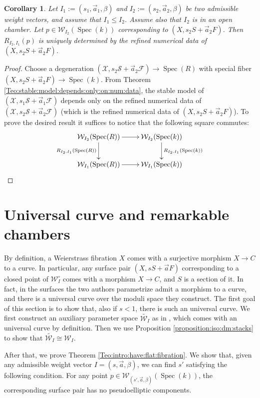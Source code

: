 \documentclass[11pt]{amsart}
\newcommand{\cF}{\mathcal{F}}
\newcommand{\cE}{\mathcal{W}}
\newcommand{\cX}{\mathcal{X}}
\newcommand{\cS}{\mathcal{S}}
\newcommand{\spec}{\operatorname{Spec}}
\newtheorem{Cor}[theorem]{Corollary}
\theoremstyle{definition}
\begin{document}
\begin{Cor}\label{Cor:image:determided:by:rnd}
Let $I_1:=(s_1,\vec{a}_1,\beta)$ and $I_2:=(s_2,\vec{a}_2,\beta)$ be two admissible weight vectors, and assume that $I_1 \le I_2$. Assume also that $I_2$ is in an open chamber. Let $p \in \cE_{I_2}(\spec(k))$ corresponding to $(X,s_2S+\vec{a}_2F)$. Then $R_{I_2,I_1}(p)$ is uniquely determined by the refined numerical data of $(X,s_2S+\vec{a}_2F)$.
\end{Cor}
\begin{proof}
Choose a degeneration $(\cX,s_2\cS+\vec{a}_2\cF) \to \spec(R)$  with special fiber $(X,s_2S+\vec{a}_2F) \to \spec(k)$. From Theorem \ref{Teo:stable:model:depends:only:on:num:data}, the stable model of
$(\cX,s_1\cS+\vec{a}_1\cF)$ depends only on the refined numerical data of $(\cX,s_2\cS+\vec{a}_2\cF)$ (which is the refined numerical data of $(X,s_2S+\vec{a}_2F)$). To prove the desired result it suffices to notice that the following square commutes:
$$\xymatrix{ \cE_{I_2}(\spec(R))  \ar[d]_-{R_{I_2,I_1}(\spec(R))} \ar[r]& \cE_{I_2}(\spec(k)) \ar[d]^{R_{I_2,I_1}(\spec(k))} \\ \cE_{I_1}(\spec(R)) \ar[r]& \cE_{I_1}(\spec(k))}$$\end{proof}
\section{Universal curve and remarkable chambers}\label{Section:universal:curve}
By definition, a Weierstrass fibration $X$ comes with a surjective morphism $X \to C$ to a curve.
In particular, any surface pair $(X,sS+\vec{a}F)$ corresponding to a closed point of $\cE_I^\circ$ comes with a morphism $X \to C$, and $S$ is a section of it.
In fact, in \cite{AB3} the surfaces
the two authors parametrize admit a morphism to a curve, and there is a universal curve over the moduli space they construct.
The first goal of this section is to show that, also if $s <1$, there is such an universal curve. We first construct an auxiliary parameter space $\widetilde{\cE_I}$ as in \cite{AB3}, which comes with an universal curve by definition. Then
we use Proposition \ref{proposition:iso:dm:stacks} to show that $\widetilde{\cE_I}\cong \cE_I$.

After that, we prove Theorem \ref{Teo:intro:have:flat:fibration}. We show that, given any admissible weight
vector $I=(s,\vec{a},\beta)$, we can find $s'$ satisfying the following condition. For any point $p \in \cE_{(s',\vec{a},\beta)}(\spec(k))$, the corresponding surface pair has no pseudoelliptic components.
\end{document}
